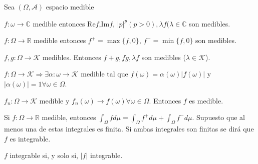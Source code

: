 \begin{nprop}
    Sea $(\Omega , \mathcal{A})$ espacio medible
    \begin{nlist}
    \item $f:\omega\rightarrow\mathbb{C}$ medible entonces Re$f$,Im$f$, $|p|^p (p>0), \lambda f (\lambda\in\mathbb{C}$ son medibles.
    \item $f:\Omega\rightarrow\mathbb{R}$ medible entonces $f^+ = \max\{f,0\}$,  $f^- = \min\{f,0\}$ son medibles.
    \item $f,g:\Omega\rightarrow\mathcal{K}$ medibles. Entonces $f+g,fg,\lambda f$ son medibles ($\lambda\in\mathcal{K}$).
    \item $f:\Omega\rightarrow\mathcal{K}\Rightarrow\exists\alpha:\omega\rightarrow\mathcal{K}$ medible tal que $f(\omega)=\alpha(\omega)|f(\omega)|$ y $|\alpha(\omega)|=1 \forall \omega\in\Omega$.
    \item $f_n:\Omega\rightarrow\mathcal{K}$ medible y $f_n(\omega)\rightarrow f(\omega) \forall \omega\in\Omega$. Entonces $f$ es medible.
    \end{nlist}
\end{nprop}


\begin{ndef}
    Si $f:\Omega\rightarrow\mathbb{R}$ medible, entonces $\int_\Omega fd\mu =\int_\Omega f^+ d\mu + \int_\Omega f^- d\mu$.
    Supuesto que al menos una de estas integrales es finita. Si ambas integrales son finitas se dirá que $f$ es integrable.
\end{ndef}

\begin{nprop}
    $f$ integrable si, y solo si, $|f|$ integrable.
\end{nprop}

